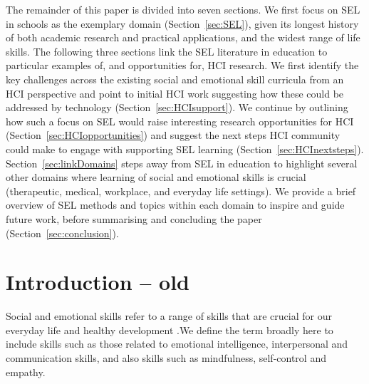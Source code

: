 \documentclass[prodmode,acmtochi]{acmsmall}
\begin{document}
The remainder of this paper is divided into seven sections.  We first focus on SEL in schools as the exemplary domain (Section~\ref{sec:SEL}), given its longest history of both academic research and practical applications, and the  widest range of life skills. The following three sections link the SEL literature in education to particular examples of, and opportunities for, HCI research. We first identify the key challenges across the existing social and emotional skill curricula from an HCI perspective and point to initial HCI work suggesting how these could be addressed by technology (Section~\ref{sec:HCIsupport}). We continue by outlining how such a focus on SEL would raise interesting research opportunities for HCI (Section~\ref{sec:HCIopportunities}) and suggest the next steps HCI community could make to engage with supporting SEL learning (Section~\ref{sec:HCInextsteps}). 
Section~\ref{sec:linkDomains} steps away from SEL in education to highlight several other domains where learning of social and emotional skills is crucial (therapeutic, medical, workplace, and everyday life settings). We provide a brief overview of SEL methods and topics within each domain to inspire and guide future work, before summarising and concluding the paper (Section~\ref{sec:conclusion}).  






\iffalse
\section{Introduction -- old}
 
 Social and emotional skills refer to a range of skills that are crucial for our everyday life and healthy development \cite{Weare2011,Adi2007a,Damon2006}.We define the term broadly here to include skills such as those related to emotional intelligence, interpersonal and communication skills, and also skills such as mindfulness, self-control and empathy. 
\end{document}
